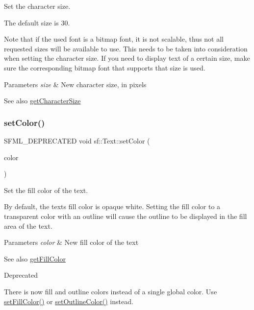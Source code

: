 Set the character size. 

The default size is 30.

Note that if the used font is a bitmap font, it is not scalable, thus not all requested sizes will be available to use. This needs to be taken into consideration when setting the character size. If you need to display text of a certain size, make sure the corresponding bitmap font that supports that size is used.


\begin{DoxyParams}{Parameters}
{\em size} & New character size, in pixels\\
\hline
\end{DoxyParams}
\begin{DoxySeeAlso}{See also}
\hyperlink{classsf_1_1_text_a46d1d7f1d513bb8d434e985a93ea5224}{get\+Character\+Size} 
\end{DoxySeeAlso}
\mbox{\label{classsf_1_1_text_a6ce65272d6d63ed01118366e92c68132}} 
\subsubsection{\texorpdfstring{set\+Color()}{setColor()}}
{\footnotesize\ttfamily S\+F\+M\+L\+\_\+\+D\+E\+P\+R\+E\+C\+A\+T\+ED void sf\+::\+Text\+::set\+Color (\begin{DoxyParamCaption}\item[{const \hyperlink{classsf_1_1_color}{Color} \&}]{color }\end{DoxyParamCaption})}



Set the fill color of the text. 

By default, the text\textquotesingle{}s fill color is opaque white. Setting the fill color to a transparent color with an outline will cause the outline to be displayed in the fill area of the text.


\begin{DoxyParams}{Parameters}
{\em color} & New fill color of the text\\
\hline
\end{DoxyParams}
\begin{DoxySeeAlso}{See also}
\hyperlink{classsf_1_1_text_a6b4ba8c435b59e1e05f831e6230dc537}{get\+Fill\+Color}
\end{DoxySeeAlso}
\begin{DoxyRefDesc}{Deprecated}
\item[\hyperlink{deprecated__deprecated000015}{Deprecated}]There is now fill and outline colors instead of a single global color. Use \hyperlink{classsf_1_1_text_ab7bb3babac5a6da1802b2c3e1a3e6dcc}{set\+Fill\+Color()} or \hyperlink{classsf_1_1_text_aa19ec69c3b894e963602a6804ca68fe4}{set\+Outline\+Color()} instead.\end{DoxyRefDesc}
\mbox{\label{classsf_1_1_text_ab7bb3babac5a6da1802b2c3e1a3e6dcc}} 
